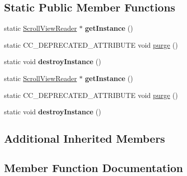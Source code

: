 \subsection*{Static Public Member Functions}
\begin{DoxyCompactItemize}
\item 
\mbox{\label{classcocostudio_1_1ScrollViewReader_a3d3e326ea7047036fe08e345c30753b0}} 
static \hyperlink{classcocostudio_1_1ScrollViewReader}{Scroll\+View\+Reader} $\ast$ {\bfseries get\+Instance} ()
\item 
static C\+C\+\_\+\+D\+E\+P\+R\+E\+C\+A\+T\+E\+D\+\_\+\+A\+T\+T\+R\+I\+B\+U\+TE void \hyperlink{classcocostudio_1_1ScrollViewReader_a2b1bf8db98e23b9efe1ad3b0f9e68334}{purge} ()
\item 
\mbox{\label{classcocostudio_1_1ScrollViewReader_a3c87fd3aa28266bc09873c2a580ad4f7}} 
static void {\bfseries destroy\+Instance} ()
\item 
\mbox{\label{classcocostudio_1_1ScrollViewReader_af922dd9e47b61642a52c608856e99824}} 
static \hyperlink{classcocostudio_1_1ScrollViewReader}{Scroll\+View\+Reader} $\ast$ {\bfseries get\+Instance} ()
\item 
static C\+C\+\_\+\+D\+E\+P\+R\+E\+C\+A\+T\+E\+D\+\_\+\+A\+T\+T\+R\+I\+B\+U\+TE void \hyperlink{classcocostudio_1_1ScrollViewReader_a2b1bf8db98e23b9efe1ad3b0f9e68334}{purge} ()
\item 
\mbox{\label{classcocostudio_1_1ScrollViewReader_a5b4a25cf044f57a6380fff55d6221273}} 
static void {\bfseries destroy\+Instance} ()
\end{DoxyCompactItemize}
\subsection*{Additional Inherited Members}


\subsection{Member Function Documentation}
\mbox{\label{classcocostudio_1_1ScrollViewReader_a2b1bf8db98e23b9efe1ad3b0f9e68334}} 
